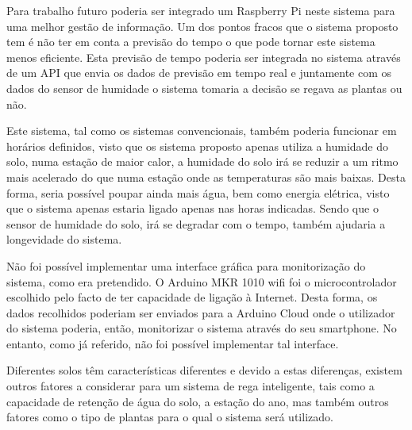 \documentclass[conference]{IEEEtran}
\begin{document}
Para trabalho futuro poderia ser integrado um Raspberry Pi neste sistema para uma melhor 
gestão de informação. Um dos pontos fracos que o sistema proposto tem é não 
ter em conta a previsão do tempo o que pode tornar este sistema menos eficiente. 
Esta previsão de tempo poderia ser integrada no sistema através de um API que 
envia os dados de previsão em tempo real e juntamente com os dados do sensor de 
humidade o sistema tomaria a decisão se regava as plantas ou não.

Este sistema, tal como os sistemas convencionais, também poderia funcionar em horários definidos, 
visto que os sistema proposto apenas utiliza a humidade do solo, numa estação de maior calor, a humidade do solo 
irá se reduzir a um ritmo mais acelerado do que numa estação onde as temperaturas são mais baixas. Desta forma, 
seria possível poupar ainda mais água, bem como energia elétrica, visto que o sistema apenas estaria ligado apenas 
nas horas indicadas. Sendo que o sensor de humidade do solo, irá se degradar com o tempo, também ajudaria a 
longevidade do sistema.

Não foi possível implementar uma interface gráfica para monitorização do sistema, como era pretendido. 
O Arduino MKR 1010 wifi foi o microcontrolador escolhido pelo facto de ter capacidade de ligação à Internet. 
Desta forma, os dados recolhidos poderiam ser enviados para a Arduino Cloud onde o utilizador do sistema poderia, 
então, monitorizar o sistema através do seu smartphone. No entanto, como já referido, não foi possível 
implementar tal interface.

Diferentes solos têm características diferentes e devido a estas diferenças, existem outros 
fatores a considerar para um sistema de rega inteligente, tais como a capacidade de retenção de água do solo, 
a estação do ano, mas também outros fatores como o tipo de plantas para o qual o sistema será utilizado.



\end{document}
